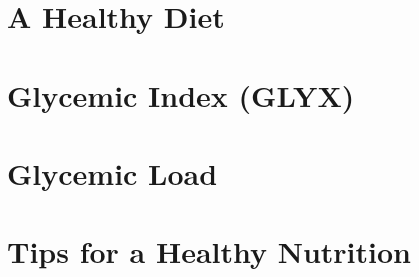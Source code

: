 \documentclass[../main.tex]{subfiles}
\begin{document}
%

%


%

%


\chapter{A Healthy Diet}


\chapter{Glycemic Index (GLYX)}\label{chap:carbs}



\chapter{Glycemic Load}



\chapter{Tips for a Healthy Nutrition}
\end{document}
